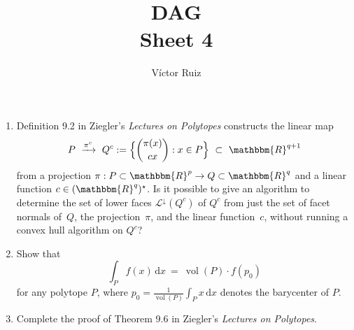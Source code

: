 \documentclass[11pt]{article}
\title{DAG \\Sheet 4}
\author{Víctor Ruiz}
\date{}
\DeclareMathOperator{\vol}{vol}
\newcommand{\RR}{\mathbbm{R}}
\begin{document}
\maketitle

\begin{enumerate}
\item Definition 9.2 in Ziegler's \emph{Lectures on Polytopes} constructs the linear map
  \[
    P
    \ \xrightarrow{\pi^c}\ 
    Q^c :=
    \Big\{ \binom{\pi(x)}{cx} : x\in P\Big\}
    \ \subset \
    \RR^{q+1}
  \]
  from a projection $\pi:P\subset\RR^p\to Q\subset\RR^q$ and a linear function $c\in(\RR^q)^\star$.
  Is it possible to give an algorithm to determine the set of lower faces $\mathcal L^\downarrow(Q^c)$ of $Q^c$ from just the set of facet normals of~$Q$, the projection~$\pi$, and the linear function~$c$, without running a convex hull algorithm on $Q^c$?

  \bigskip\bigskip
\item Show that
  \[
    \int_P f(x)\,\text{d}x
    \ = \
    \vol(P) \cdot f(p_0)
  \]
  for any polytope $P$, where $p_0 = \frac{1}{\vol(P)}\int_P x\,\text{d}x$ denotes the barycenter of $P$.
  \bigskip\bigskip
\item Complete the proof of Theorem 9.6 in Ziegler's \emph{Lectures on Polytopes}.
  
\end{enumerate}
\end{document}
